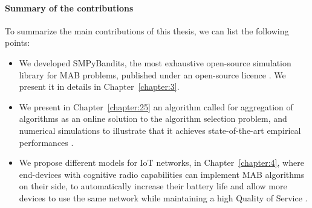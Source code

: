 
\newpage %

\paragraph{Summary of the contributions}
\label{sec:1:summaryOfContributions}

To summarize the main contributions of this thesis, we can list the following points:

\begin{itemize}


    \item
    We developed SMPyBandits, the most exhaustive open-source simulation library for MAB problems, published under an open-source licence \cite{SMPyBandits,SMPyBanditsJMLR}.
    We present it in details in Chapter~\ref{chapter:3}.

    \item
    We present in Chapter~\ref{chapter:25} an algorithm called \Aggr{} for aggregation of algorithms as an online solution to the algorithm selection problem, and numerical simulations to illustrate that it achieves state-of-the-art empirical performances
    \cite{Besson2018WCNC}.

    \item
    We propose different models for IoT networks, in Chapter~\ref{chapter:4}, where end-devices with cognitive radio capabilities can implement MAB algorithms on their side, to automatically increase their battery life and allow more devices to use the same network while maintaining a high Quality of Service
    \cite{Bonnefoi17,Besson2019WCNC,Bonnefoi2019WCNC}.


\end{itemize}
